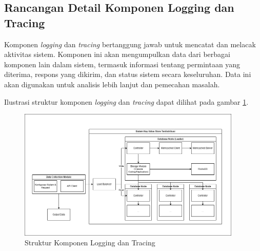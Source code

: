 \subsection{Rancangan Detail Komponen Logging dan Tracing}
\label{subsection:detail-data-logging-tracing}

Komponen \textit{logging} dan \textit{tracing} bertanggung jawab untuk mencatat dan melacak aktivitas sistem. Komponen ini akan mengumpulkan data dari berbagai komponen lain dalam sistem, termasuk informasi tentang permintaan yang diterima, respons yang dikirim, dan status sistem secara keseluruhan. Data ini akan digunakan untuk analisis lebih lanjut dan pemecahan masalah.

Ilustrasi struktur komponen \textit{logging} dan \textit{tracing} dapat dilihat pada gambar \ref{fig:logging-tracing-structure}.

\begin{figure}[ht]
    \centering
    \includegraphics[width=0.95\textwidth]{resources/chapter-3/general-architecture.png}
    \caption{Struktur Komponen Logging dan Tracing}
    \label{fig:logging-tracing-structure}
\end{figure}